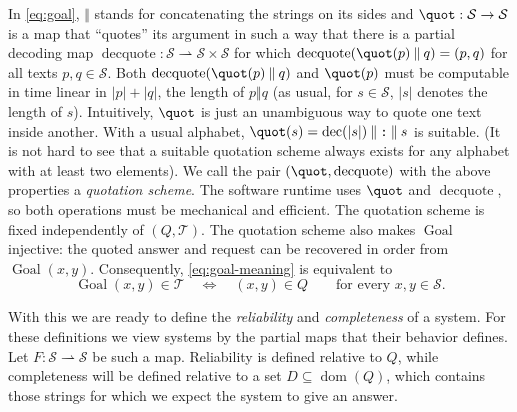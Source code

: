 \documentclass[11pt,twoside]{article}
\theoremstyle{definition}
\newcommand{\Stext}{\mathcal S}
\newcommand{\True}{\mathcal T}
\newcommand{\Goal}{\operatorname{Goal}}
\newcommand{\dom}{\operatorname{dom}}
\newcommand{\cat}{\mathbin{\Vert}}
\begin{document}
In \cref{eq:goal}, $\cat$ stands for concatenating the strings on its sides and
$\quot: \Stext \to \Stext$ is a map that
``quotes'' its argument in such a way
that there is a partial decoding map
$\operatorname{decquote}:\Stext\rightharpoonup\Stext\times\Stext$ for which
$\operatorname{decquote}(\quot(p)\cat q)=(p,q)$ for all texts
$p,q\in \Stext$.
Both $\operatorname{decquote}(\quot(p)\cat q)$ and $\quot(p)$ must be computable in time linear in
$|p|+|q|$,
the length of $p \cat q$ (as usual, for $s\in \Stext$, $|s|$ denotes the length of $s$).
Intuitively, $\quot$ is just an unambiguous way to quote one text inside another. With
a usual alphabet, $\quot(s) = \mathrm{dec}(|s|) \cat \texttt{:} \cat s$ is suitable.
(It is not hard to see that a suitable
quotation scheme always exists for any alphabet with at least two elements).
We call the pair $(\quot,\operatorname{decquote})$ with the above properties a
\emph{quotation scheme}.
The software runtime uses $\quot$ and $\operatorname{decquote}$, so both operations must be
mechanical and efficient. The quotation scheme is fixed independently of
$(Q,\True)$. The quotation scheme also makes $\Goal$ injective: the quoted
answer and request can be recovered in order from $\Goal(x,y)$.
Consequently, \cref{eq:goal-meaning} is equivalent to
\begin{equation}
 \Goal(x,y)\in\True\quad\Longleftrightarrow\quad (x,y)\in Q
 \qquad\text{for every }x,y\in\Stext.
 \label{eq:goal-pointwise}
\end{equation}

With this we are ready to define the \emph{reliability} and \emph{completeness} of a system.
For these definitions we view systems by the partial maps that their behavior defines.
Let
$F:\Stext\rightharpoonup\Stext$ be such a map.
Reliability is defined relative to $Q$, while
completeness will be defined relative to a set
$D\subseteq\dom(Q)$, which contains those strings for which we expect the system
to give an answer.
\end{document}

